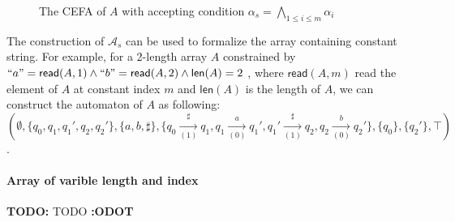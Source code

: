 \documentclass[12pt]{article}
\newcommand*{\aut}{\mathcal{A}}
\newcommand{\arrseparator}{\sharp}
\newcommand{\todo}[1]{{\color{orange}\textbf{TODO:} #1 \textbf{:ODOT}\color{black}}}
\newcommand{\mylen}{\mathsf{len}}
\newcommand{\myread}{\mathsf{read}}
\theoremstyle{remark}
\begin{document}
{\begin{figure}[H]
\begin{tikzpicture}[initial text =, initial distance=3ex,
                node distance=1.2cm, auto,
                state/.style={circle, draw, inner sep=0pt, minimum size=5mm},
                accepting by double]
        \end{tikzpicture}
        \caption{The CEFA of $A$ with accepting condition $\alpha_s = \bigwedge\limits_{1\leq i \leq m} \alpha_i$}
        \label{fig:fixed_len_cons_idx}
    \end{figure}
    The construction of $\aut_s$ can be used to formalize the array containing constant string. For example, for a 2-length array $A$ constrained by $``a" = \myread(A, 1)\wedge ``b" = \myread(A, 2) \wedge \mylen(A) = 2$ , where $\myread(A, m)$ read the  element of $A$ at constant index $m$ and $\mylen(A)$ is the length of $A$, we can construct the automaton of $A$ as following: \\
    $(\emptyset, \{q_0,q_1,q_1',q_2,q_2'\}, \{a,b,\arrseparator\}, \{q_0\xrightarrow[(1)]{\arrseparator}q_1, q_1\xrightarrow[(0)]{a}q_1', q_1'\xrightarrow[(1)]{\arrseparator}q_2, q_2\xrightarrow[(0)]{b}q_2'\}, \{q_0\}, \{q_2'\}, \top)$. 
    \paragraph{Array of varible length and index} \todo{TODO}
}%
\end{document}
